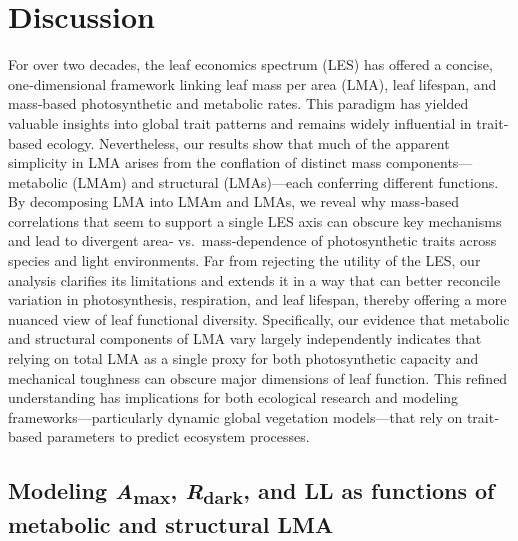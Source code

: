 \documentclass[
  12pt,
  letterpaper,
  DIV=11,
  numbers=noendperiod]{scrartcl}
\begin{document}
\section{Discussion}\label{discussion}

For over two decades, the leaf economics spectrum (LES) has offered a
concise, one‐dimensional framework linking leaf mass per area (LMA),
leaf lifespan, and mass‐based photosynthetic and metabolic rates. This
paradigm has yielded valuable insights into global trait patterns and
remains widely influential in trait‐based ecology. Nevertheless, our
results show that much of the apparent simplicity in LMA arises from the
conflation of distinct mass components---metabolic (LMAm) and structural
(LMAs)---each conferring different functions. By decomposing LMA into
LMAm and LMAs, we reveal why mass‐based correlations that seem to
support a single LES axis can obscure key mechanisms and lead to
divergent area‐ vs.~mass‐dependence of photosynthetic traits across
species and light environments. Far from rejecting the utility of the
LES, our analysis clarifies its limitations and extends it in a way that
can better reconcile variation in photosynthesis, respiration, and leaf
lifespan, thereby offering a more nuanced view of leaf functional
diversity. Specifically, our evidence that metabolic and structural
components of LMA vary largely independently indicates that relying on
total LMA as a single proxy for both photosynthetic capacity and
mechanical toughness can obscure major dimensions of leaf function. This
refined understanding has implications for both ecological research and
modeling frameworks---particularly dynamic global vegetation
models---that rely on trait‐based parameters to predict ecosystem
processes.　

\subsection{\texorpdfstring{Modeling \emph{A}\textsubscript{max},
\emph{R}\textsubscript{dark}, and LL as functions of metabolic and
structural
LMA}{Modeling Amax, Rdark, and LL as functions of metabolic and structural LMA}}\label{modeling-amax-rdark-and-ll-as-functions-of-metabolic-and-structural-lma}
\end{document}
